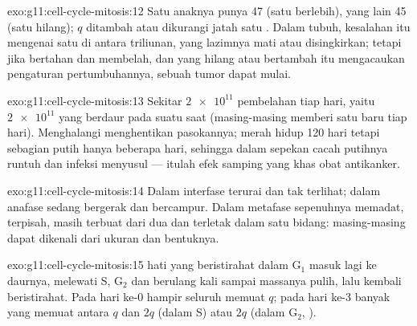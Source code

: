 \begin{solution}{exo:g11:cell-cycle-mitosis:12}
Satu anaknya punya 47  (satu berlebih), yang lain 45 (satu
hilang);  $q$ ditambah atau dikurangi jatah satu . Dalam
 tubuh, kesalahan itu mengenai satu  di antara triliunan, yang
lazimnya mati atau disingkirkan; tetapi jika  bertahan dan
membelah, dan  yang hilang atau bertambah itu mengacaukan
pengaturan pertumbuhannya, sebuah tumor dapat mulai.
\end{solution}

\begin{solution}{exo:g11:cell-cycle-mitosis:13}
Sekitar $\num{2e11}$ pembelahan tiap hari, yaitu $\num{2e11}$  yang
berdaur pada suatu saat (masing-masing memberi satu  baru tiap
hari). Menghalangi  menghentikan pasokannya;  merah hidup 120
hari tetapi sebagian  putih hanya beberapa hari, sehingga dalam
sepekan cacah  putihnya runtuh dan infeksi menyusul --- itulah efek
samping yang khas obat antikanker.
\end{solution}

\begin{solution}{exo:g11:cell-cycle-mitosis:14}
Dalam interfase  terurai dan tak terlihat; dalam anafase
 sedang bergerak dan bercampur. Dalam metafase 
sepenuhnya memadat, terpisah, masih terbuat dari dua  dan
terletak dalam satu bidang: masing-masing dapat dikenali dari ukuran
dan bentuknya.
\end{solution}

\begin{solution}{exo:g11:cell-cycle-mitosis:15}
 hati yang beristirahat dalam $\mathrm{G_1}$ masuk lagi ke daurnya,
melewati S, $\mathrm{G_2}$ dan  berulang kali sampai massanya
pulih, lalu kembali beristirahat. Pada hari ke-0 hampir seluruh 
memuat $q$; pada hari ke-3 banyak yang memuat antara $q$ dan $2q$
(dalam S) atau $2q$ (dalam $\mathrm{G_2}$, ).
\end{solution}

